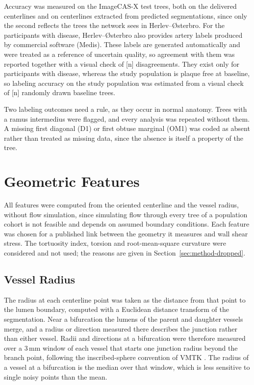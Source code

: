 Accuracy was measured on the ImageCAS-X test trees, both on the delivered centerlines and on
centerlines extracted from predicted segmentations, since only the second reflects the trees the
network sees in Herlev--{\O}sterbro.
For the participants with disease, Herlev--{\O}sterbro also provides artery labels produced by
commercial software (Medis).
These labels are generated automatically and were treated as a reference of uncertain quality, so
agreement with them was reported together with a visual check of [n] disagreements.
They exist only for participants with disease, whereas the study population is plaque free at
baseline, so labeling accuracy on the study population was estimated from a visual check of [n]
randomly drawn baseline trees.

Two labeling outcomes need a rule, as they occur in normal anatomy.
Trees with a ramus intermedius were flagged, and every analysis was repeated without them.
A missing first diagonal (D1) or first obtuse marginal (OM1) was coded as absent rather than
treated as missing data, since the absence is itself a property of the tree.


\section{Geometric Features}
\label{sec:method-features}

All features were computed from the oriented centerline and the vessel radius, without flow
simulation, since simulating flow through every tree of a population cohort is not feasible and
depends on assumed boundary conditions.
Each feature was chosen for a published link between the geometry it measures and wall shear
stress.
The tortuosity index, torsion and root-mean-square curvature were considered and not used; the
reasons are given in Section~\ref{sec:method-dropped}.

\subsection{Vessel Radius}

The radius at each centerline point was taken as the distance from that point to the lumen
boundary, computed with a Euclidean distance transform of the segmentation.
Near a bifurcation the lumens of the parent and daughter vessels merge, and a radius or direction
measured there describes the junction rather than either vessel.
Radii and directions at a bifurcation were therefore measured over a 3\,mm window of each vessel
that starts one junction radius beyond the branch point, following the inscribed-sphere convention
of VMTK \cite{antiga2008vmtk}.
The radius of a vessel at a bifurcation is the median over that window, which is less sensitive to
single noisy points than the mean.

